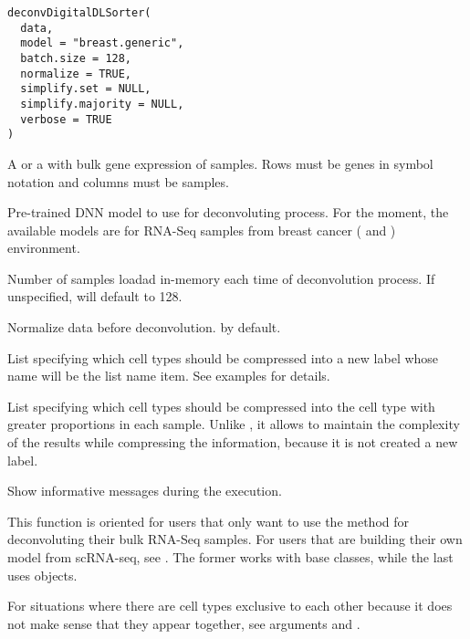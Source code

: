 \documentclass[a4paper]{book}
\begin{document}
%
\begin{Usage}
\begin{verbatim}
deconvDigitalDLSorter(
  data,
  model = "breast.generic",
  batch.size = 128,
  normalize = TRUE,
  simplify.set = NULL,
  simplify.majority = NULL,
  verbose = TRUE
)
\end{verbatim}
\end{Usage}
%
\begin{Arguments}
\begin{ldescription}
\item[\code{data}] A  or a  with bulk gene expression
of samples. Rows must be genes in symbol notation and columns must be
samples.

\item[\code{model}] Pre-trained DNN model to use for deconvoluting process. For the
moment, the available models are for RNA-Seq samples from breast cancer
( and )
environment.

\item[\code{batch.size}] Number of samples loadad in-memory each time of
deconvolution process. If unspecified,  will default to
128.

\item[\code{normalize}] Normalize data before deconvolution.  by default.

\item[\code{simplify.set}] List specifying which cell types should be compressed
into a new label whose name will be the list name item. See examples for
details.

\item[\code{simplify.majority}] List specifying which cell types should be
compressed into the cell type with greater proportions in each sample.
Unlike , it allows to maintain the complexity of the
results while compressing the information, because it is not created a new
label.

\item[\code{verbose}] Show informative messages during the execution.
\end{ldescription}
\end{Arguments}
%
\begin{Details}\relax
This function is oriented for users that only want to use the method for
deconvoluting their bulk RNA-Seq samples. For users that are building their
own model from scRNA-seq, see . The
former works with base classes, while the last uses 
objects.

For situations where there are cell types exclusive to each other because it
does not make sense that they appear together, see arguments
 and .
\end{Details}
\end{document}
